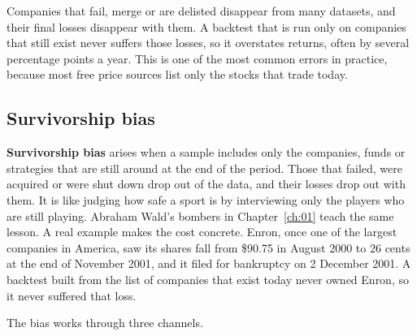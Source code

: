 Companies that fail, merge or are delisted disappear from many datasets, and their final losses disappear with them. A backtest that is run only on companies that still exist never suffers those losses, so it overstates returns, often by several percentage points a year. This is one of the most common errors in practice, because most free price sources list only the stocks that trade today.

\subsection{Survivorship bias}

\textbf{Survivorship bias} arises when a sample includes only the companies, funds or strategies that are still around at the end of the period. Those that failed, were acquired or were shut down drop out of the data, and their losses drop out with them. It is like judging how safe a sport is by interviewing only the players who are still playing. Abraham Wald's bombers in Chapter~\ref{ch:01} teach the same lesson. A real example makes the cost concrete. Enron, once one of the largest companies in America, saw its shares fall from \$90.75 in August 2000 to 26 cents at the end of November 2001, and it filed for bankruptcy on 2 December 2001. A backtest built from the list of companies that exist today never owned Enron, so it never suffered that loss.

The bias works through three channels.

